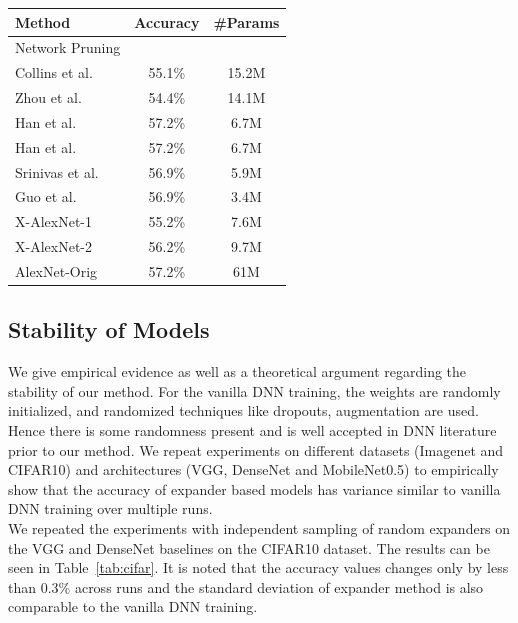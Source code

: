 \begin{table}[t]%
    \centering
\begin{tabular}{|l|c|c|}
\hline
{\bf Method} & {\bf Accuracy} & {\bf \#Params}\\ \hline
Network Pruning & & \\
\hline
Collins et al.\cite{collins2014memory} & 55.1\% & 15.2M \\
Zhou et al. \cite{zhou2016less} & 54.4\% & 14.1M \\
Han et al. \cite{han2015deep} &  57.2\% & 6.7M  \\
Han et al. \cite{han2015deep} & 57.2\% & 6.7M \\
 Srinivas et al. \cite{srinivas2017training} & 56.9\% & 5.9M \\
Guo et al. \cite{guo2016dynamic} & 56.9\% & 3.4M  \\
X-AlexNet-1 & 55.2\% & 7.6M  \\
X-AlexNet-2 & 56.2\% & 9.7M \\
\hline
AlexNet-Orig & 57.2\% & 61M \\
\hline
\end{tabular}
\label{tab:imagenet_fullcomp}
    \end{table}
  

\subsection{Stability of Models}
\noindent We give empirical evidence as well as a theoretical argument regarding the stability of our method. For the vanilla DNN training, the weights are randomly initialized, and randomized techniques like dropouts, augmentation are used. Hence there is some randomness present and is well accepted in DNN literature prior to our method. We repeat experiments on different datasets (Imagenet and CIFAR10) and architectures (VGG, DenseNet and MobileNet0.5) to empirically show that the accuracy of expander based models has variance similar to vanilla DNN training over multiple runs.\\

\noindent We repeated the experiments with independent sampling of random expanders on the VGG and DenseNet baselines on the CIFAR10 dataset. The results can be seen in Table~\ref{tab:cifar}. It is noted that the accuracy values changes only by less than $0.3$\% across runs and the standard deviation of expander method is also comparable to the vanilla DNN training.\\

